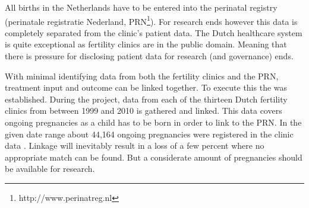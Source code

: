 All births in the Netherlands have to be entered into the perinatal registry (perinatale registratie Nederland, PRN\footnote{http://www.perinatreg.nl}).
For research ends however this data is completely separated from the clinic's patient data.
The Dutch healthcare system is quite exceptional as fertility clinics are in the public domain.
Meaning that there is pressure for disclosing patient data for research (and governance) ends.

With minimal identifying data from both the fertility clinics and the PRN, treatment input and outcome can be linked together.
To execute this the \project{} was established.
During the project, data from each of the thirteen Dutch fertility clinics from between 1999 and 2010 is gathered and linked.
This data covers ongoing pregnancies as a child has to be born in order to link to the PRN.
In the given date range about 44,164 ongoing pregnancies were registered in the clinic data \cite{ivfReportNVOG}.
Linkage will inevitably result in a loss of a few percent where no appropriate match can be found.
But a considerate amount of pregnancies should be available for research.